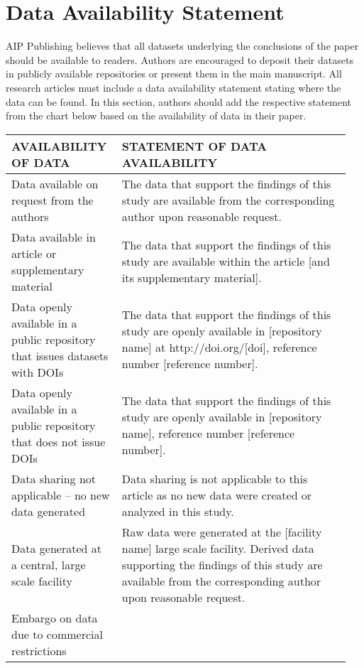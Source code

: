 \documentclass[%
 aip,
 amsmath,amssymb,
 reprint,%
]{revtex4-1}
\begin{document}
\section*{Data Availability Statement}

AIP Publishing believes that all datasets underlying the conclusions of the paper should be available to readers. Authors are encouraged to deposit their datasets in publicly available repositories or present them in the main manuscript. All research articles must include a data availability statement stating where the data can be found. In this section, authors should add the respective statement from the chart below based on the availability of data in their paper.

\begin{center}
\renewcommand\arraystretch{1.2}
\begin{tabular}{| >{\raggedright\arraybackslash}p{0.3\linewidth} | >{\raggedright\arraybackslash}p{0.65\linewidth} |}
\hline
\textbf{AVAILABILITY OF DATA} & \textbf{STATEMENT OF DATA AVAILABILITY}\\  
\hline
Data available on request from the authors
&
The data that support the findings of this study are available from the corresponding author upon reasonable request.
\\\hline
Data available in article or supplementary material
&
The data that support the findings of this study are available within the article [and its supplementary material].
\\\hline
Data openly available in a public repository that issues datasets with DOIs
&
The data that support the findings of this study are openly available in [repository name] at http://doi.org/[doi], reference number [reference number].
\\\hline
Data openly available in a public repository that does not issue DOIs
&
The data that support the findings of this study are openly available in [repository name], reference number [reference number].
\\\hline
Data sharing not applicable – no new data generated
&
Data sharing is not applicable to this article as no new data were created or analyzed in this study.
\\\hline
Data generated at a central, large scale facility
&
Raw data were generated at the [facility name] large scale facility. Derived data supporting the findings of this study are available from the corresponding author upon reasonable request.
\\\hline
Embargo on data due to commercial restrictions

\end{tabular}
\end{center}
\end{document}
